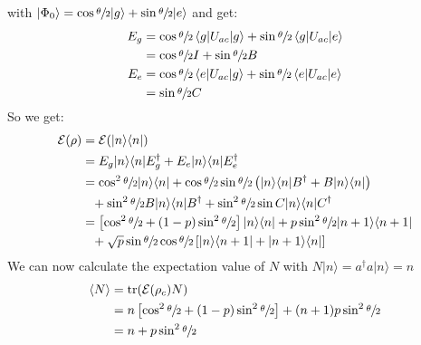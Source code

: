 \documentclass[12pt]{book}
\theoremstyle{definition}
\newcommand{\scalar}[1]{\left\langle {#1}\right\rangle}
\newcommand{\para}[1]{\left( {#1} \right)}
\newcommand{\bra}[1]{\langle {#1} \vert}
\newcommand{\ket}[1]{\vert {#1} \rangle}
\DeclareMathOperator{\tr}{tr}
\begin{document}
with $\ket{\Phi_0} = \cos\sfrac\theta 2 \ket{g} + \sin \sfrac\theta 2 \ket{e}$ and get:
\begin{align*}
  E_g & = \cos\sfrac\theta 2 \scalar{g \vert U_{ac} \vert g} + \sin\sfrac\theta 2 \scalar{g \vert U_{ac} \vert e} \\
  & = \cos\sfrac\theta 2 I + \sin \sfrac\theta 2 B \\
  E_e & = \cos \sfrac\theta 2 \scalar{e \vert U_{ac} \vert g} + \sin\sfrac\theta 2 \scalar{e \vert U_{ac} \vert e} \\
  & = \sin\sfrac\theta 2 C
\end{align*}
So we get:
\begin{align*}
  \mathcal E(\rho) & = \mathcal E(\ket{n}\bra{n}) \\
  & = E_g \ket{n}\bra{n} E_g^\dagger + E_e \ket{n}\bra{n} E_e^\dagger \\
  & = \cos^2 \sfrac \theta 2 \ket{n}\bra{n} + \cos\sfrac \theta 2\sin\sfrac \theta 2\para{\ket{n}\bra{n} B^\dagger + B \ket{n}\bra{n}} \\
  & \phantom{=} + \sin^2\sfrac \theta 2 B \ket{n}\bra{n} B^\dagger + \sin^2\sfrac \theta 2\sin C \ket{n}\bra{n} C^\dagger \\
  & = \left[\cos^2\sfrac \theta 2 + (1-p) \sin^2\sfrac \theta 2\right] \ket{n}\bra{n} + p \sin^2 \sfrac \theta 2 \ket{n+1} \bra{n+1} \\
  & \phantom{=} + \sqrt{p} \sin\sfrac \theta 2\cos\sfrac \theta 2 \left[ \ket{n} \bra{n+1} + \ket{n+1}\bra{n}\right] \\
\end{align*}
We can now calculate the expectation value of $N$ with $N \ket{n} = a^\dagger a \ket{n} = n$
\begin{align*}
  \scalar{N} & = \tr(\mathcal E(\rho_c) N) \\
  & = n \left[\cos^2 \sfrac \theta 2 + (1 - p)\sin^2\sfrac \theta 2\right] + (n+1) p \sin^2 \sfrac \theta 2 \\
  & = n + p \sin^2 \sfrac \theta 2
\end{align*}
\end{document}
